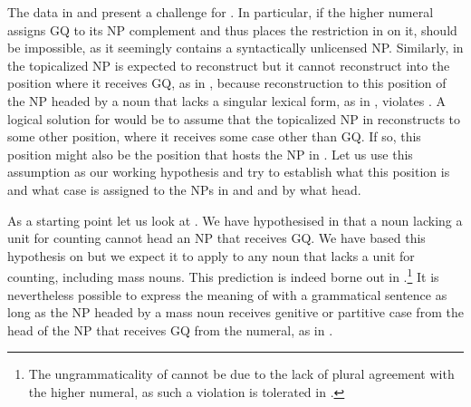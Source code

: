 \documentclass[output=paper,
modfonts,
newtxmath,
hidelinks
]{langscibook}
\begin{document}
\ea \label{18:ex10}
	\z
\z

\noindent The data in  and  present a challenge for . In particular, if the higher numeral assigns GQ to its NP complement and thus places the restriction in  on it,  should be impossible, as it seemingly contains a syntactically unlicensed NP. Similarly, in  the topicalized NP is expected to reconstruct but it cannot reconstruct into the position where it receives GQ, as in , because reconstruction to this position of the NP headed by a noun that lacks a singular lexical form, as in , violates . A logical solution for  would be to assume that the topicalized NP in  reconstructs to some other position, where it receives some case other than GQ. If so, this position might also be the position that hosts the NP in . Let us use this assumption as our working hypothesis and try to establish what this position is and what case is assigned to the NPs in  and  and by what head. 

As a starting point let us look at . We have hypothesised in  that a noun lacking a unit for counting cannot head an NP that receives GQ. We have based this hypothesis on  but we expect it to apply to any noun that lacks a unit for counting, including mass nouns. This prediction is indeed borne out in .\footnote{\label{18:fn9}The ungrammaticality of  cannot be due to the lack of plural agreement with the higher numeral, as such a violation is tolerated in .} 
It is nevertheless possible to express the meaning of  with a grammatical sentence as long as the NP headed by a mass noun receives genitive or partitive case from the head of the NP that receives GQ from the numeral, as in .
\end{document}
